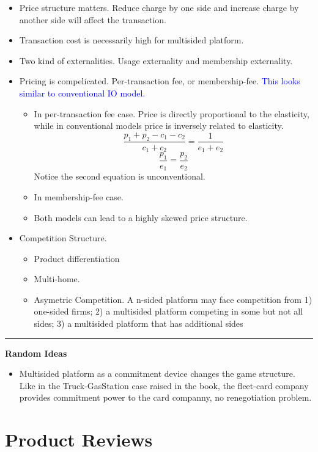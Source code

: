 \documentclass{book}
\theoremstyle{plain}
\theoremstyle{definition}
\newcommand{\myline}{\vspace{3mm} \hrule \vspace{4mm}}
\begin{document}
\textbf{ }
\begin{itemize}
	\item Price structure matters. Reduce charge by one side and increase charge by another side will affect the transaction.
	\item Transaction cost is necessarily high for multisided platform.
	\item Two kind of externalities. Usage externality and membership externality.
	\item Pricing is compelicated. Per-transaction fee, or membership-fee. \textcolor{blue}{This looks similar to conventional IO model.}
	\begin{itemize}
		\item In per-transaction fee case. Price is directly proportional to the elasticity, while in conventional models price is inversely related to elasticity.
		\[\frac{p_1+p_2-c_1-c_2}{c_1+c_2}=\frac{1}{e_1+e_2}\]
		\[\frac{p_1}{e_1}=\frac{p_2}{e_2}\]
		Notice the second equation is unconventional.
		\item In membership-fee case.
		\item Both models can lead to a highly skewed price structure.
	\end{itemize}
	\item Competition Structure.
	\begin{itemize}
		\item Product differentiation
		\item Multi-home.
		\item Asymetric Competition. A n-sided platform may face competition from 1) one-sided firms; 2) a multisided platform competing in some but not all sides; 3) a multisided platform that has additional sides
	\end{itemize}
\end{itemize}


\myline

\textbf{Random Ideas}
\begin{itemize}
	\item Multisided platform as a commitment device changes the game structure. Like in the Truck-GasStation case raised in the book, the fleet-card company provides commitment power to the card companny, no renegotiation problem.
\end{itemize}



\chapter{Product Reviews} %
\label{cha:product_reviews}
\end{document}
